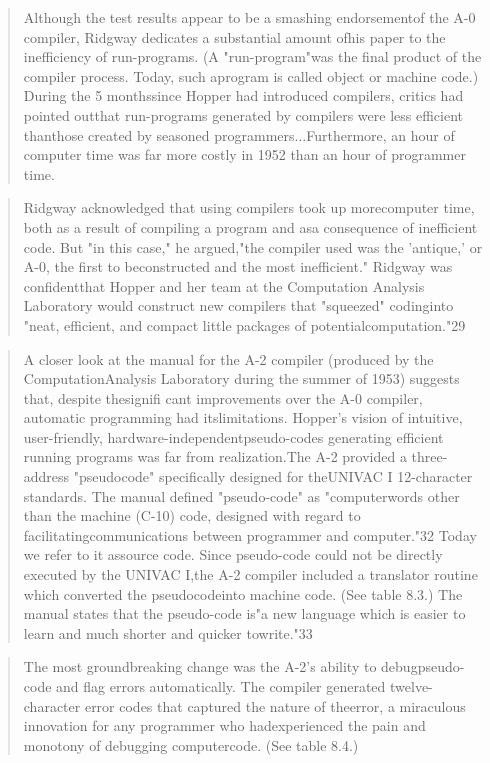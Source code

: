 \begin{quotation}
	Although the test results appear to be a smashing endorsementof the A-0
	compiler, Ridgway dedicates a substantial amount ofhis paper to the
	inefficiency of run-programs. (A "run-program"was the final product of the
	compiler process. Today, such aprogram is called object or machine code.)
	During the 5 monthssince Hopper had introduced compilers, critics had pointed
	outthat run-programs generated by compilers were less efficient thanthose
	created by seasoned programmers...Furthermore, an hour of computer time was far
	more costly in 1952 than an hour of programmer time.
\end{quotation}
\begin{quotation}
	Ridgway acknowledged that using compilers took up morecomputer time, both as a
	result of compiling a program and asa consequence of inefficient code. But "in
	this case," he argued,"the compiler used was the 'antique,' or A-0, the first
	to beconstructed and the most inefficient." Ridgway was confidentthat Hopper
	and her team at the Computation Analysis Laboratory would construct new
	compilers that "squeezed" codinginto "neat, efficient, and compact little
	packages of potentialcomputation."29
\end{quotation}
\begin{quotation}
	A closer look at the manual for the A-2 compiler (produced by the
	ComputationAnalysis Laboratory during the summer of 1953) suggests that,
	despite thesignifi cant improvements over the A-0 compiler, automatic
	programming had itslimitations.  Hopper's vision of intuitive, user-friendly,
	hardware-independentpseudo-codes generating efficient running programs was far
	from realization.The A-2 provided a three-address "pseudocode" specifically
	designed for theUNIVAC I 12-character standards. The manual defined
	"pseudo-code" as "computerwords other than the machine (C-10) code, designed
	with regard to facilitatingcommunications between programmer and computer."32
	Today we refer to it assource code. Since pseudo-code could not be directly
	executed by the UNIVAC I,the A-2 compiler included a translator routine which
	converted the pseudocodeinto machine code. (See table 8.3.) The manual states
	that the pseudo-code is"a new language which is easier to learn and much
	shorter and quicker towrite."33
\end{quotation}
\begin{quotation}
	The most groundbreaking change was the A-2's ability to debugpseudo-code and
	flag errors automatically. The compiler generated twelve-character error codes
	that captured the nature of theerror, a miraculous innovation for any
	programmer who hadexperienced the pain and monotony of debugging computercode.
	(See table 8.4.)
\end{quotation}
